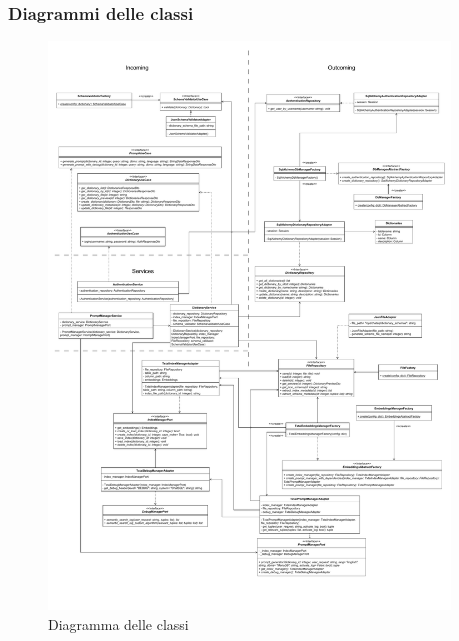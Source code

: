 \subsubsection{Diagrammi delle classi}

\begin{figure}[H]
  \centering
  \includegraphics[width=0.95\textwidth]{assets/Backend/diagramma_classi.pdf}
  \caption{Diagramma delle classi}
\end{figure}
